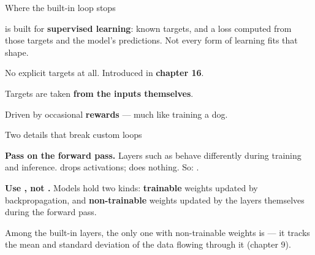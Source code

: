 \documentclass[aspectratio=169,11pt,t]{beamer}
\begin{document}
\begin{frame}[shrink=25]{Where the built-in loop stops}
{\fontsize{9.4}{12.6}\selectfont\color{fg2} is built for \textbf{supervised learning}: known targets, and a loss computed from those targets and the model's predictions. Not every form of learning fits that shape.\par}\vskip 4pt
\begin{minipage}[t]{0.3253\textwidth}
\begin{icard}
No explicit targets at all. Introduced in \textbf{chapter 16}.
\end{icard}
\end{minipage}%
\hfill
\begin{minipage}[t]{0.3253\textwidth}
\begin{icard}
Targets are taken \textbf{from the inputs themselves}.
\end{icard}
\end{minipage}%
\hfill
\begin{minipage}[t]{0.3253\textwidth}
\begin{icard}
Driven by occasional \textbf{rewards} --- much like training a dog.
\end{icard}
\end{minipage}%
\end{frame}

\begin{frame}[shrink=25]{Two details that break custom loops}
\begin{isteps}
\item \textbf{Pass  on the forward pass.} Layers such as  behave differently during training and inference.  drops activations;  does nothing. So: .
\item \textbf{Use , not .} Models hold two kinds: \textbf{trainable} weights updated by backpropagation, and \textbf{non-trainable} weights updated by the layers themselves during the forward pass.
\end{isteps}
\begin{iband}[signal]
Among the built-in layers, the only one with non-trainable weights is \textbf{} --- it tracks the mean and standard deviation of the data flowing through it (chapter 9).
\end{iband}
\end{frame}
\end{document}
